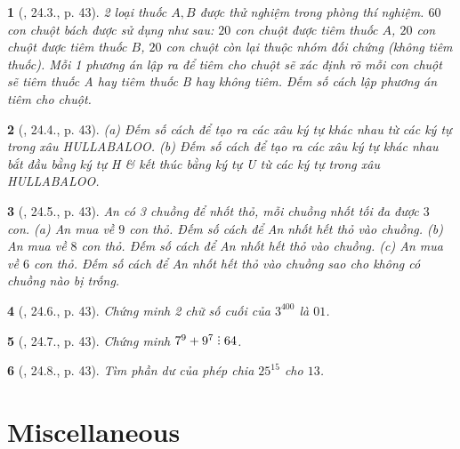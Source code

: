 \documentclass{article}
\newtheorem{baitoan}{}
\DeclareRobustCommand{\divby}{%
	\mathrel{\vbox{\baselineskip.65ex\lineskiplimit0pt\hbox{.}\hbox{.}\hbox{.}}}%
}
\begin{document}
\begin{baitoan}[\cite{Hai_Hung_Thu_Tung_ncpt_Toan_10_tap_2}, 24.3., p. 43]
	2 loại thuốc $A,B$ được thử nghiệm trong phòng thí nghiệm. $60$ con chuột bách được sử dụng như sau: $20$ con chuột được tiêm thuốc $A$, $20$ con chuột được tiêm thuốc $B$, $20$ con chuột còn lại thuộc nhóm đối chứng (không tiêm thuốc). Mỗi 1 phương án lập ra để tiêm cho chuột sẽ xác định rõ mỗi con chuột sẽ tiêm thuốc A hay tiêm thuốc B hay không tiêm. Đếm số cách lập phương án tiêm cho chuột.
\end{baitoan}

\begin{baitoan}[\cite{Hai_Hung_Thu_Tung_ncpt_Toan_10_tap_2}, 24.4., p. 43]
	(a) Đếm số cách để tạo ra các xâu ký tự khác nhau từ các ký tự trong xâu {\rm HULLABALOO}. (b) Đếm số cách để tạo ra các xâu ký tự khác nhau bắt đầu bằng ký tự H \& kết thúc bằng ký tự U từ các ký tự trong xâu {\rm HULLABALOO}.
\end{baitoan}

\begin{baitoan}[\cite{Hai_Hung_Thu_Tung_ncpt_Toan_10_tap_2}, 24.5., p. 43]
	An có 3 chuồng để nhốt thỏ, mỗi chuồng nhốt tối đa được $3$ con. (a) An mua về $9$ con thỏ. Đếm số cách để An nhốt hết thỏ vào chuồng. (b) An mua về $8$ con thỏ. Đếm số cách để An nhốt hết thỏ vào chuồng. (c) An mua về $6$ con thỏ. Đếm số cách để An nhốt hết thỏ vào chuồng sao cho không có chuồng nào bị trống.
\end{baitoan}

\begin{baitoan}[\cite{Hai_Hung_Thu_Tung_ncpt_Toan_10_tap_2}, 24.6., p. 43]
	Chứng minh 2 chữ số cuối của $3^{400}$ là $01$.
\end{baitoan}

\begin{baitoan}[\cite{Hai_Hung_Thu_Tung_ncpt_Toan_10_tap_2}, 24.7., p. 43]
	Chứng minh $7^9 + 9^7\divby64$.
\end{baitoan}

\begin{baitoan}[\cite{Hai_Hung_Thu_Tung_ncpt_Toan_10_tap_2}, 24.8., p. 43]
	Tìm phần dư của phép chia $25^{15}$ cho $13$.
\end{baitoan}


\section{Miscellaneous}
\end{document}
